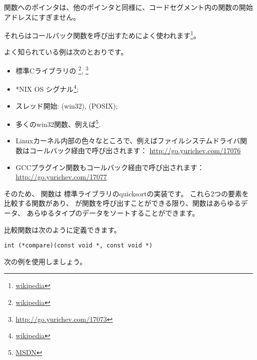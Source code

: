 ﻿\newcommand{\comp}{\TT{comp()}\xspace}
\label{sec:pointerstofunctions}

\myindex{\CLanguageElements!\Pointers}

関数へのポインタは、他のポインタと同様に、コードセグメント内の関数の開始アドレスにすぎません。

それらはコールバック関数を呼び出すためによく使われます\footnote{\href{http://go.yurichev.com/17071}{wikipedia}}。

よく知られている例は次のとおりです。

\begin{itemize}
\item 標準Cライブラリの \qsort\footnote{\href{http://go.yurichev.com/17072}{wikipedia}},
{}\footnote{\url{http://go.yurichev.com/17073}}

\item *NIX OS シグナル\footnote{\href{http://go.yurichev.com/17074}{wikipedia}};

\item スレッド開始:  (win32),  (POSIX);

\item 多くのwin32関数、例えば\footnote{\href{http://go.yurichev.com/17075}{MSDN}}.

\item Linuxカーネル内部の色々なところで、例えばファイルシステムドライバ関数はコールバック経由で呼び出されます：
\url{http://go.yurichev.com/17076}

\item GCCプラグイン関数もコールバック経由で呼び出されます：
\url{http://go.yurichev.com/17077}

\end{itemize}


そのため、 \qsort 関数は \CCpp 標準ライブラリのquicksortの実装です。 
これら2つの要素を比較する関数があり、 \qsort が関数を呼び出すことができる限り、関数はあらゆるデータ、
あらゆるタイプのデータをソートすることができます。

比較関数は次のように定義できます。

\begin{lstlisting}
int (*compare)(const void *, const void *)
\end{lstlisting}

次の例を使用しましょう。




